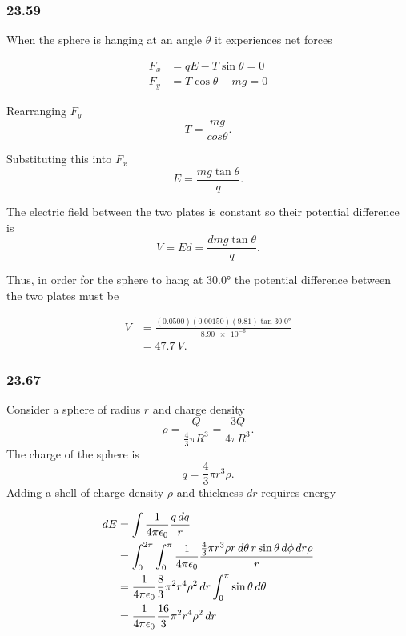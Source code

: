 \documentclass{article}
\begin{document}
\subsubsection{23.59}

When the sphere is hanging at an angle $\theta$ it experiences net forces

\begin{align*}
  F_x & = q E - T \sin \theta = 0 \\
  F_y & = T \cos \theta - m g = 0
\end{align*}

Rearranging $F_y$ \[T = \frac{m g}{cos \theta}.\]

Substituting this into $F_x$ \[E = \frac{m g \tan \theta}{q}.\]

The electric field between the two plates is constant so their potential difference is \[V = E d = \frac{d m g \tan \theta}{q}.\]

Thus, in order for the sphere to hang at $\ang{30.0}$ the potential difference between the two plates must be

\begin{align*}
  V & = \frac{(0.0500) (0.00150) (9.81) \tan \ang{30.0}}{\num{8.90e-6}} \\
    & = \qty{47.7}{V}.
\end{align*}

\subsubsection{23.67}

Consider a sphere of radius $r$ and charge density \[\rho = \frac{Q}{\frac{4}{3} \pi R^3} = \frac{3 Q}{4 \pi R^3}.\] The charge of the sphere is \[q = \frac{4}{3} \pi r^3 \rho.\] Adding a shell of charge density $\rho$ and thickness $dr$ requires energy

\begin{align*}
  dE & = \int \frac{1}{4 \pi \epsilon_0} \frac{q \,dq}{r}                                                                                      \\
     & = \int_0^{2 \pi} \int_0^\pi \frac{1}{4 \pi \epsilon_0} \frac{\frac{4}{3} \pi r^3 \rho r \,d\theta \,r \sin \theta \,d\phi \,dr \rho}{r} \\
     & = \frac{1}{4 \pi \epsilon_0} \frac{8}{3} \pi^2 r^4 \rho^2 \,dr \int_0^\pi \sin \theta \,d\theta                                         \\
     & = \frac{1}{4 \pi \epsilon_0} \frac{16}{3} \pi^2 r^4 \rho^2 \,dr
\end{align*}
\end{document}
